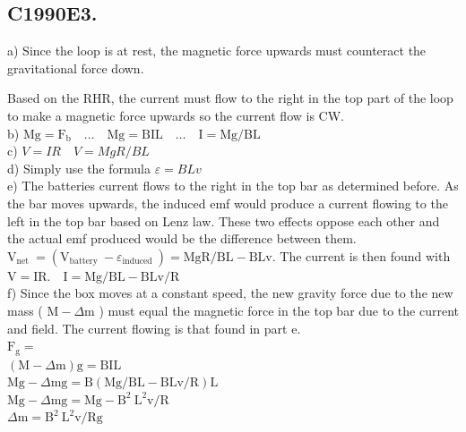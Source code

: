 \begin{enumerate}
\section*{C1990E3.}
a) Since the loop is at rest, the magnetic force upwards must counteract the gravitational force down.

Based on the RHR, the current must flow to the right in the top part of the loop to make a magnetic force upwards so the current flow is CW.\\
b) $\mathrm{Mg}=\mathrm{F}_{\mathrm{b}} \quad \ldots \quad \mathrm{Mg}=\mathrm{BIL} \quad \ldots \quad \mathrm{I}=\mathrm{Mg} / \mathrm{BL}$\\
c) $V=I R \quad V=M g R / B L$\\
d) Simply use the formula $\varepsilon=B L v$\\
e) The batteries current flows to the right in the top bar as determined before. As the bar moves upwards, the induced emf would produce a current flowing to the left in the top bar based on Lenz law. These two effects oppose each other and the actual emf produced would be the difference between them. $\mathrm{V}_{\text {net }}=\left(\mathrm{V}_{\text {battery }}-\varepsilon_{\text {induced }}\right)=\mathrm{MgR} / \mathrm{BL}-\mathrm{BLv}$. The current is then found with $\mathrm{V}=\mathrm{IR} . \quad \mathrm{I}=\mathrm{Mg} / \mathrm{BL}-\mathrm{BLv} / \mathrm{R}$\\
f) Since the box moves at a constant speed, the new gravity force due to the new mass ( $\mathrm{M}-\Delta \mathrm{m}$ ) must equal the magnetic force in the top bar due to the current and field. The current flowing is that found in part e.\\
$\mathrm{F}_{\mathrm{g}}=$\\
$(\mathrm{M}-\Delta \mathrm{m}) \mathrm{g}=\mathrm{BIL}$\\
$\mathrm{Mg}-\Delta \mathrm{mg}=\mathrm{B}(\mathrm{Mg} / \mathrm{BL}-\mathrm{BLv} / \mathrm{R}) \mathrm{L}$\\
$\mathrm{Mg}-\Delta \mathrm{mg}=\mathrm{Mg}-\mathrm{B}^{2} \mathrm{~L}^{2} \mathrm{v} / \mathrm{R}$\\
$\Delta \mathrm{m}=\mathrm{B}^{2} \mathrm{~L}^{2} \mathrm{v} / \mathrm{Rg}$


\end{enumerate}

